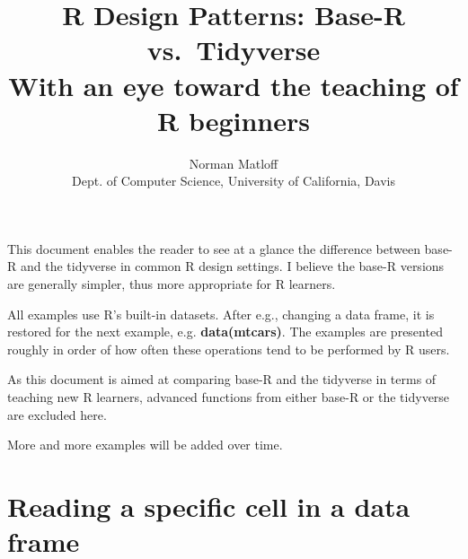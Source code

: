 \documentclass[11pt]{article}
\title{R Design Patterns: Base-R vs.\ Tidyverse \\
   With an eye toward the teaching of R beginners}
\author{Norman Matloff \\
      Dept. of Computer Science, University of California, Davis}
\begin{document}
\maketitle

This document enables the reader to see at a glance the difference
between base-R and the tidyverse in common R design settings.  I believe
the base-R versions are generally simpler, thus more appropriate for R
learners.

All examples use R's built-in datasets.  After e.g., changing a data
frame, it is restored for the next example, e.g. \textbf{data(mtcars)}.
The examples are presented roughly in order of how often these
operations tend to be performed by R users.

As this document is aimed at comparing base-R and the tidyverse in terms
of teaching new R learners, advanced functions from either base-R or the
tidyverse are excluded here.

More and more examples will be added over time.

\section*{Reading a specific cell in a data frame}



\begin{parcolumns}[rulebetween=true]{2}


\hspace{0.1in}


\end{parcolumns}
\end{document}
